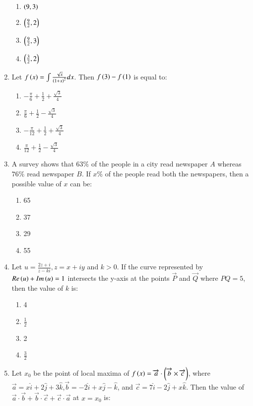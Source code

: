 \documentclass[journal]{IEEEtran}
\begin{document}
\begin{enumerate}
\begin{enumerate}
    \item $\left(9,3\right)$
    \item $\left(\frac{9}{2},2\right)$
    \item $\left(\frac{9}{2},3\right)$
    \item $\left(\frac{3}{2},2\right)$
\end{enumerate}
\item Let $f\left(x\right)=\int\frac{\sqrt{x}}{\left(1+x\right)^2} dx$. Then $f\left(3\right)-f\left(1\right)$ is equal to:
\begin{enumerate}
    \item $-\frac{\pi}{6}+\frac{1}{2}+\frac{\sqrt{3}}{4}$
    \item $\frac{\pi}{6}+\frac{1}{2}-\frac{\sqrt{3}}{4}$
    \item $-\frac{\pi}{12}+\frac{1}{2}+\frac{\sqrt{3}}{4}$
    \item $\frac{\pi}{12}+\frac{1}{2}-\frac{\sqrt{3}}{4}$
\end{enumerate}
\item A survey shows that $63\%$ of the people in a city read newspaper $ A$ whereas $76\%$ read newspaper $B$. If $x\%$ of the people read both the newspapers, then a possible value of $x$ can be:
\begin{enumerate}
\item 65 
\item 37
\item 29 
\item 55
\end{enumerate}
\item Let $u=\frac{2z+i}{z-ki},z=x+iy$ and $k>0$. If the curve represented by $Re\left(u\right)+Im\left(u\right)=1$ intersects the y-axis at the points $\vec{P}$ and $\vec{Q}$ where $PQ=5$, then the value of $k$ is:
\begin{enumerate}
    \item 4
    \item $\frac{1}{2}$
    \item 2
    \item $\frac{3}{2}$
\end{enumerate}
\item Let $x_0$ be the point of local maxima of $f\left(x\right)=\overrightarrow{a}\cdot\left(\overrightarrow{b}\times \overrightarrow{c}\right)$, where $\overrightarrow{a}=x\hat{i}+2\hat{j}+3\hat{k}$,$\overrightarrow{b}=-2\hat{i}+x\hat{j}-\hat{k}$, and $\overrightarrow{c}=7\hat{i}-2\hat{j}+x\hat{k}$. Then the value of $ \overrightarrow{a}\cdot \overrightarrow{b}+\overrightarrow{b}\cdot \overrightarrow{c}+\overrightarrow{c}\cdot \overrightarrow{a}$ at $x=x_0$ is:

\end{enumerate}
\end{document}
